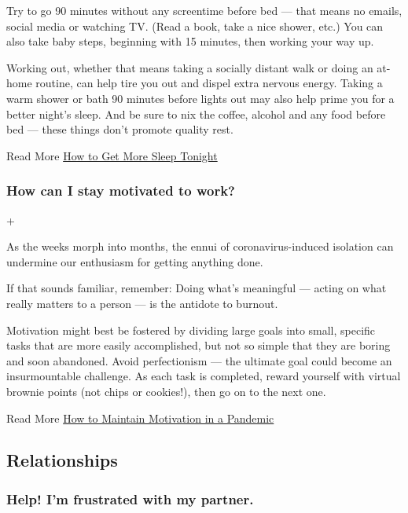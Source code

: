 Try to go 90 minutes without any screentime before bed --- that means no
emails, social media or watching TV. (Read a book, take a nice shower,
etc.) You can also take baby steps, beginning with 15 minutes, then
working your way up.

Working out, whether that means taking a socially distant walk or doing
an at-home routine, can help tire you out and dispel extra nervous
energy. Taking a warm shower or bath 90 minutes before lights out may
also help prime you for a better night's sleep. And be sure to nix the
coffee, alcohol and any food before bed --- these things don't promote
quality rest.

Read More
\href{https://www.nytimes3xbfgragh.onion/2020/03/25/style/self-care/sleep-tips-benefits-coronavirus.html}{How
to Get More Sleep Tonight}

\hypertarget{how-can-i-stay-motivated-to-work}{%
\subsubsection{How can I stay motivated to
work?}\label{how-can-i-stay-motivated-to-work}}

+

As the weeks morph into months, the ennui of coronavirus-induced
isolation can undermine our enthusiasm for getting anything done.

If that sounds familiar, remember: Doing what's meaningful --- acting on
what really matters to a person --- is the antidote to burnout.

Motivation might best be fostered by dividing large goals into small,
specific tasks that are more easily accomplished, but not so simple that
they are boring and soon abandoned. Avoid perfectionism --- the ultimate
goal could become an insurmountable challenge. As each task is
completed, reward yourself with virtual brownie points (not chips or
cookies!), then go on to the next one.

Read More
\href{https://www.nytimes3xbfgragh.onion/2020/05/18/well/mind/motivation-pandemic-coronavirus.html}{How
to Maintain Motivation in a Pandemic}

\hypertarget{relationships}{%
\subsection{Relationships}\label{relationships}}

\hypertarget{help-im-frustrated-with-my-partner}{%
\subsubsection{Help! I'm frustrated with my
partner.}\label{help-im-frustrated-with-my-partner}}

